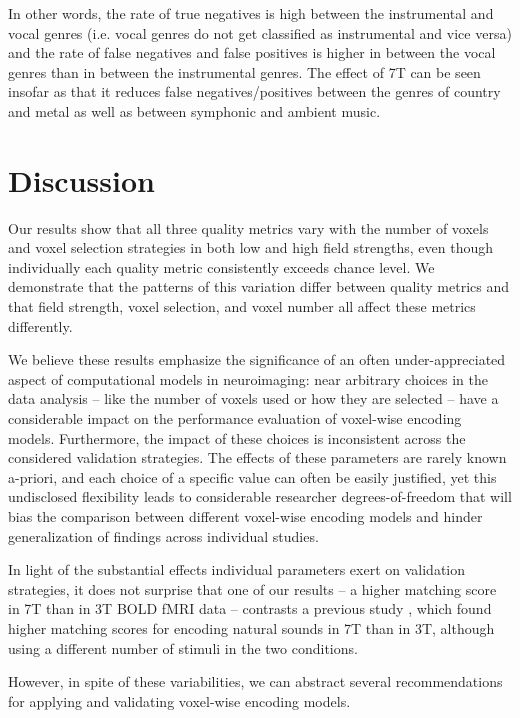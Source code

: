 In other words, the rate of true negatives is high between the instrumental and vocal genres (i.e. vocal genres do not get classified as instrumental and vice versa) and the rate of false negatives and false positives is higher in between the vocal genres than in between the instrumental genres.
The effect of 7T can be seen insofar as that it reduces false negatives/positives between the genres of country and metal as well as between symphonic and ambient music.

\section*{Discussion}

Our results show that all three quality metrics vary with the number of voxels and voxel selection strategies in both low and high field strengths, even though individually each quality metric consistently exceeds chance level. We demonstrate that the patterns of this variation differ between quality metrics and that field strength, voxel selection, and voxel number all affect these metrics differently.

We believe these results emphasize the significance of an often under-appreciated aspect of computational models in neuroimaging: near arbitrary choices in the data analysis -- like the number of voxels used or how they are selected -- have a considerable impact on the performance evaluation of voxel-wise encoding models. Furthermore, the impact of these choices is inconsistent across the considered validation strategies. The effects of these parameters are rarely known a-priori, and each choice of a specific value can often be easily justified, yet this undisclosed flexibility leads to considerable researcher degrees-of-freedom \citep{SNS11,hong2019false} that will bias the comparison between different voxel-wise encoding models and hinder generalization of findings across individual studies.

In light of the substantial effects individual parameters exert on validation strategies, it does not surprise that one of our results -- a higher matching score in 7T than in 3T BOLD fMRI data -- contrasts a  previous study \citep{SF14}, which found higher matching scores for encoding natural sounds in 7T than in 3T, although using a different number of stimuli in the two conditions.

However, in spite of these variabilities, we can abstract several recommendations for applying and validating voxel-wise encoding models.

